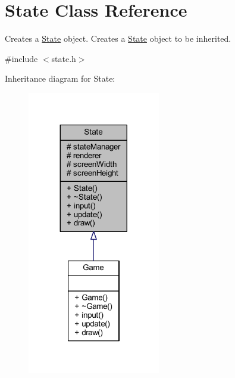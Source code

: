 \hypertarget{class_state}{\section{State Class Reference}
\label{class_state}
}


Creates a \hyperlink{class_state}{State} object. Creates a \hyperlink{class_state}{State} object to be inherited.  




{\ttfamily \#include $<$state.\+h$>$}



Inheritance diagram for State\+:\nopagebreak
\begin{figure}[H]
\begin{center}
\leavevmode
\includegraphics[width=164pt]{class_state__inherit__graph}
\end{center}
\end{figure}


